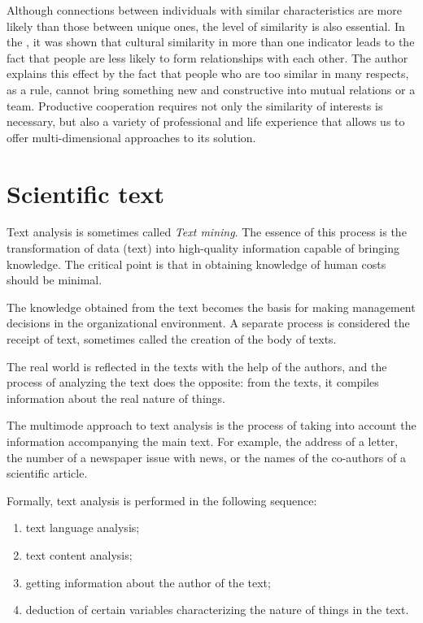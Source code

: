 \documentclass[12pt]{report}
\theoremstyle{definition}
\providecommand{\tightlist}{%
	\setlength{\itemsep}{0pt}\setlength{\parskip}{0pt}}
\begin{document}
Although connections between individuals with similar characteristics are more likely than those between unique ones, the level of similarity is also essential.
In the \cite{block2014multidimensional}, it was shown that cultural similarity in more than one indicator leads to the fact that people are less likely to form relationships with each other.
The author explains this effect by the fact that people who are too similar in many respects, as a rule, cannot bring something new and constructive into mutual relations or a team.
Productive cooperation requires not only the similarity of interests is necessary, but also a variety of professional and life experience that allows us to offer multi-dimensional approaches to its solution.

\section{Scientific text}

Text analysis is sometimes called \textit{Text mining}. 
The essence of this process is the transformation of data (text) into high-quality information capable of bringing knowledge.
The critical point is that in obtaining knowledge of human costs should be minimal.

The knowledge obtained from the text becomes the basis for making management decisions in the organizational environment.
A separate process is considered the receipt of text, sometimes called the creation of the body of texts.

The real world is reflected in the texts with the help of the authors, and the process of analyzing the text does the opposite: from the texts, it compiles information about the real nature of things.

The multimode approach to text analysis is the process of taking into account the information accompanying the main text.
For example, the address of a letter, the number of a newspaper issue with news, or the names of the co-authors of a scientific article.

Formally, text analysis is performed in the following sequence:
\begin{enumerate}
	\tightlist
	\item text language analysis;
	\item text content analysis;
	\item getting information about the author of the text;
	\item deduction of certain variables characterizing the nature of things in the text.
\end{enumerate}
\end{document}
